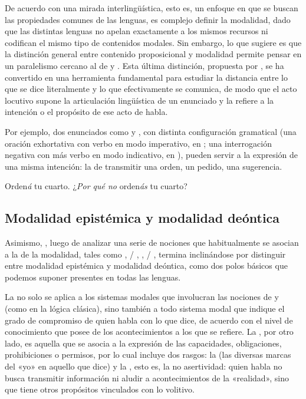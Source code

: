 De acuerdo con una mirada interlingüística, esto es, un enfoque en que se buscan
las propiedades comunes de las lenguas, es complejo definir la modalidad, dado
que las distintas lenguas no apelan exactamente a los mismos recursos ni
codifican el mismo tipo de contenidos modales. Sin embargo, lo que
\textcite{palmer1986} sugiere es que la distinción general entre contenido
proposicional y modalidad permite pensar en un paralelismo cercano al de
 y . Esta última distinción,
propuesta por \textcite{austin1971}, se ha convertido en una herramienta
fundamental para estudiar la distancia entre lo que se dice literalmente y lo
que efectivamente se comunica, de modo que el acto locutivo supone la
articulación lingüística de un enunciado y la  refiere
a la intención o el propósito de ese acto de habla.

Por ejemplo, dos enunciados como  y ,
con distinta configuración gramatical (una oración exhortativa con verbo en modo
imperativo, en ; una interrogación negativa con  más verbo en modo indicativo, en ), pueden servir a la
expresión de una misma intención: la de transmitir una orden, un pedido, una
sugerencia.

\begin{exe}
  \ex\label{ex:14-ordena} Orden\textit{á} tu cuarto.
  \ex\label{ex:14-porque} ¿\textit{Por qué no} orden\textit{ás} tu cuarto?
\end{exe}

\subsection{Modalidad epistémica y modalidad deóntica}\label{sec:14-epistemica}

Asimismo, \textcite{palmer1986}, luego de analizar una serie de nociones que
habitualmente se asocian a la de la modalidad, tales como ,
 / , ,  /
, termina inclinándose por distinguir entre modalidad epistémica
y modalidad deóntica, como dos polos básicos que podemos suponer presentes en
todas las lenguas.

\begin{destacado}
La  no solo se aplica a los sistemas modales que
involucran las nociones de  y  (como en la
lógica clásica), sino también a todo sistema modal que indique el grado de
compromiso de quien habla con lo que dice, de acuerdo con el nivel de
conocimiento que posee de los acontecimientos a los que se refiere. La
, por otro lado, es aquella que se asocia a la
expresión de las capacidades, obligaciones, prohibiciones o permisos, por lo
cual incluye dos rasgos: la  (las diversas marcas del «yo» en
aquello que dice) y la , esto es, la no asertividad: quien
habla no busca transmitir información ni aludir a acontecimientos de la
«realidad», sino que tiene otros propósitos vinculados con lo volitivo.
\end{destacado}

